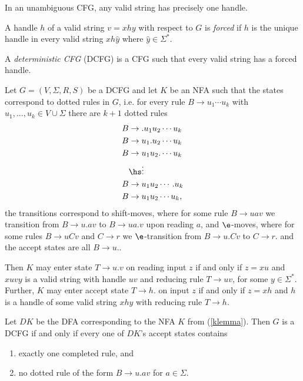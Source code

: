 \documentclass{article}
\begin{document}
\begin{lemma}[Sipser p. 137]
    In an unambiguous CFG, any valid string has precisely one handle.
\end{lemma}

\begin{definition}
    A handle $h$ of a valid string $v=xhy$ with respect to $G$ is \emph{forced} if $h$ is
    the unique handle in every valid string $xh\hat y$ where $\hat y\in\Sigma^*$.
\end{definition}

\begin{definition}
    A \emph{deterministic CFG} (DCFG) is a CFG such that every valid string has a forced handle.
\end{definition}

\begin{lemma}[Sipser p. 140]
    \label{klemma}
    Let $G=(V,\Sigma,R,S)$ be a DCFG and let $K$ be an NFA such that the states correspond to
    dotted rules in $G$, i.e. for every rule $B\to u_1\cdots u_k$ with $u_1,...,u_k\in V\cup\Sigma$
    there are $k+1$ dotted rules
    \begin{align*}
        B & \to .u_1u_2\cdots u_k \\
        B & \to u_1.u_2\cdots u_k \\
        B & \to u_1u_2.\cdots u_k \\
          & \hs\vdots             \\
        B & \to u_1u_2\cdots .u_k \\
        B & \to u_1u_2\cdots u_k,
    \end{align*}
    the transitions correspond to shift-moves, where for some rule $B\to uav$ we transition from
    $B\to u.av$ to $B\to ua.v$ upon reading $a$, and $\e$-moves, where for some rules
    $B\to uCv$ and $C\to r$ we $\e$-transition from $B\to u.Cv$ to $C\to r.$ and the accept states
    are all $B\to u.$.

    Then $K$ may enter state $T\to u.v$ on reading input $z$ if and only if $z=xu$ and
    $xuvy$ is a valid string with handle $uv$ and reducing rule $T\to uv$, for some $y\in\Sigma^*$.
    Further, $K$ may enter accept state $T\to h.$ on input $z$ if and only if $z=xh$ and $h$ is a
    handle of some valid string $xhy$ with reducing rule $T\to h$.
\end{lemma}

\begin{theorem}
    Let $DK$ be the DFA corresponding to the NFA $K$ from (\ref{klemma}). Then $G$ is a
    DCFG if and only if every one of $DK$'s accept states contains
    \begin{enumerate}
        \item exactly one completed rule, and
        \item no dotted rule of the form $B\to u.av$ for $a\in\Sigma$.
    \end{enumerate}
\end{theorem}
\end{document}
